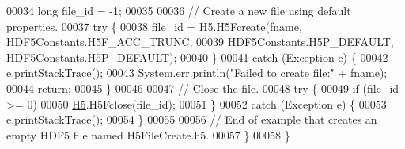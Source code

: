 \begin{DoxyCode}
00034         \textcolor{keywordtype}{long} file\_id = -1;
00035 
00036         \textcolor{comment}{// Create a new file using default properties.}
00037         \textcolor{keywordflow}{try} \{
00038             file\_id = \hyperlink{namespace_h5}{H5}.H5Fcreate(fname, HDF5Constants.H5F\_ACC\_TRUNC,
00039                     HDF5Constants.H5P\_DEFAULT, HDF5Constants.H5P\_DEFAULT);
00040         \}
00041         \textcolor{keywordflow}{catch} (Exception e) \{
00042             e.printStackTrace();
00043             \hyperlink{namespace_system}{System}.err.println(\textcolor{stringliteral}{"Failed to create file:"} + fname);
00044             \textcolor{keywordflow}{return};
00045         \}
00046 
00047         \textcolor{comment}{// Close the file.}
00048         \textcolor{keywordflow}{try} \{
00049             \textcolor{keywordflow}{if} (file\_id >= 0)
00050                 \hyperlink{namespace_h5}{H5}.H5Fclose(file\_id);
00051         \}
00052         \textcolor{keywordflow}{catch} (Exception e) \{
00053             e.printStackTrace();
00054         \}
00055 
00056         \textcolor{comment}{// End of example that creates an empty HDF5 file named H5FileCreate.h5.}
00057     \}
00058 \}
\end{DoxyCode}

